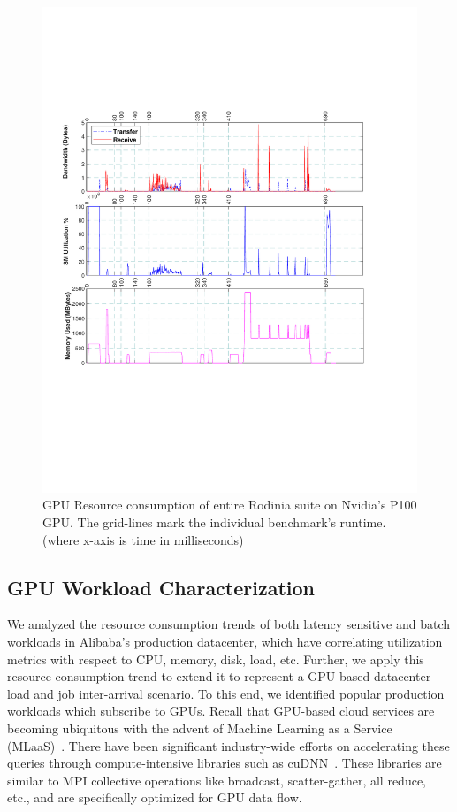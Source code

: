 \begin{figure}
\centering
  \includegraphics[width=0.99\linewidth ]
  {results/util.pdf}
  \vspace{-2mm}
  \caption{GPU Resource consumption of entire Rodinia suite on Nvidia's P100 GPU. The grid-lines mark the individual benchmark's runtime.(where x-axis is time in milliseconds)}
  \label{fig:rodinia-peaks}
\end{figure}



\subsection{GPU Workload Characterization}
We analyzed the resource consumption trends of both latency sensitive and batch workloads in Alibaba's production datacenter, which have correlating utilization metrics with respect to CPU, memory, disk, load, etc. Further, we apply this resource consumption trend to extend it to represent a GPU-based datacenter load and job inter-arrival scenario. To this end, we identified popular production workloads which subscribe to GPUs. Recall that GPU-based cloud services are becoming ubiquitous with the advent of Machine Learning as a Service (MLaaS)~\cite{gujarati2017swayam}. There have been significant industry-wide efforts on accelerating these queries through compute-intensive libraries such as cuDNN~\cite{ChetlurWVCTCS14}. These libraries are similar to MPI collective operations like broadcast, scatter-gather, all reduce, etc., and are specifically optimized for GPU data flow. 

